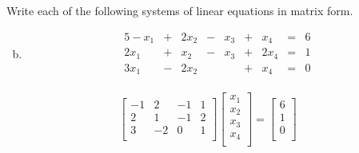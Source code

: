 \documentclass[../main.tex]{subfiles}
\begin{document}
Write each of the following systems of linear equations in matrix form.
\begin{enumerate}[a)]
	\setcounter{enumi}{1}
	\item
		\begin{alignat*}{5}
			-x_1 & {}+{} & 2x_2 & {}-{} & x_3 & {}+{} &  x_4 & {}={} & 6 \\
			2x_1 & {}+{} &  x_2 & {}-{} & x_3 & {}+{} & 2x_4 & {}={} & 1 \\
			3x_1 & {}-{} & 2x_2 &       &     & {}+{} &  x_4 & {}={} & 0 \\
		\end{alignat*}
\end{enumerate}

\solution
		
        \[\left[\begin{array}{rrrr}
			-1 & 2 & -1 & 1 \\
			2 & 1 & -1 & 2 \\
			3 & -2 & 0 & 1 \\
		\end{array}\right]
        \left[\begin{array}{r}
            x_1 \\
            x_2 \\
            x_3 \\
            x_4 \\
        \end{array}\right]
        =
        \left[\begin{array}{r}
            6 \\
            1 \\
            0 \\
        \end{array}\right] 
        \]
\end{document}
